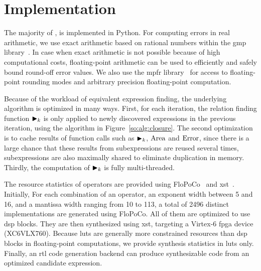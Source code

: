 \section{Implementation}
\label{so:sec:implementation}

The majority of \soap, is implemented in Python.  For computing errors in
real arithmetic, we use exact arithmetic based on rational numbers within the
\gls{gmp} library~\cite{gmp}.  In case when exact arithmetic is not possible
because of high computational costs, floating-point arithmetic can be used
to efficiently and safely bound round-off error values.  We also use the
\gls{mpfr} library~\cite{mpfr} for access to floating-point rounding modes and
arbitrary precision floating-point computation.

Because of the workload of equivalent expression finding, the underlying
algorithm is optimized in many ways. First, for each iteration, the relation
finding function $\operatorname{\blacktriangleright}_k$ is only applied to newly discovered expressions
in the previous iteration, using the algorithm in Figure~\ref{so:alg:closure}.
The second optimization is to cache results of function calls such as
$\operatorname{\blacktriangleright}_k$, $\operatorname{\mathrm{Area}}$ and $\operatorname{\mathrm{Error}}$, since there is a large chance that these
results from subexpressions are reused several times, subexpressions are also
maximally shared to eliminate duplication in memory.  Thirdly, the computation
of $\operatorname{\blacktriangleright}_k$ is fully multi-threaded.

The resource statistics of operators are provided using FloPoCo~\cite{flopoco}
and \gls{xst}~\cite{xst}.  Initially, For each combination of an operator,
an exponent width between 5 and 16, and a mantissa width ranging from 10 to
113, a total of 2496 distinct implementations are generated using FloPoCo.
All of them are optimized to use \gls{dsp} blocks.  They are then synthesized
using \gls{xst}, targeting a Virtex-6 \gls{fpga} device (XC6VLX760).  Because
\glspl{lut} are generally more constrained resources than \gls{dsp} blocks in
floating-point computations, we provide synthesis statistics in \glspl{lut}
only.  Finally, an \gls{rtl} code generation backend can produce synthesizable
code from an optimized candidate expression.
